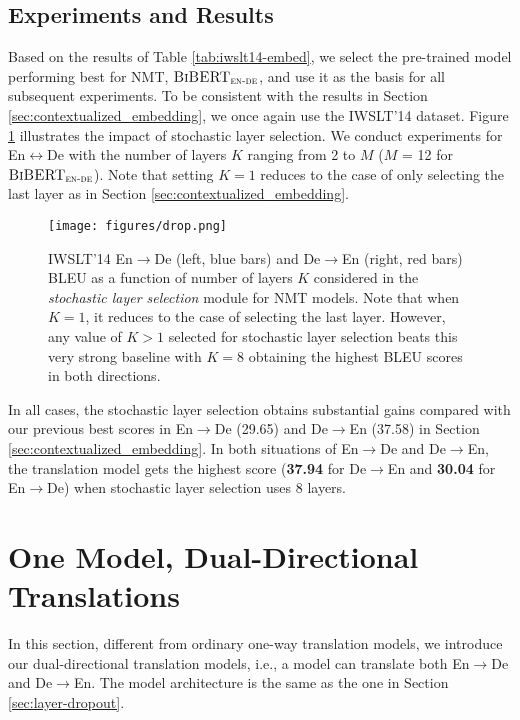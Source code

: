 \documentclass[11pt]{article}
\begin{document}
\subsection{Experiments and Results}
Based on the results of Table \ref{tab:iwslt14-embed}, we select the pre-trained model performing best for NMT, $\textsc{BiBERT}_\textsc{en-de}$, and use it as the basis for
all subsequent experiments. To be consistent with the results in Section \ref{sec:contextualized_embedding}, we once again use the IWSLT'14 dataset. Figure \ref{fig:drop} illustrates the impact of stochastic layer selection. We conduct experiments for En$\leftrightarrow$De with the number of layers $K$ ranging from 2 to $M$ ($M$ = 12 for $\textsc{BiBERT}_\textsc{en-de}$). Note that setting $K=1$ reduces to the case of only selecting  the last layer as in Section \ref{sec:contextualized_embedding}.
\begin{figure}[t]
    \centering
    \texttt{[image: figures/drop.png]}
    \caption{IWSLT'14 En$\rightarrow$De (left, blue bars) and De$\rightarrow$En (right, red bars) BLEU as a function of number of layers $K$ considered in the \textit{stochastic layer selection} module for NMT models. Note that when $K=1$, it reduces to the case of selecting the last layer. However, any value of $K>1$ selected for stochastic layer selection beats this very strong baseline with $K=8$ obtaining the highest BLEU scores in both directions.}
    \label{fig:drop}
\end{figure}

In all cases, the stochastic layer selection obtains substantial gains compared with our previous best scores in En$\rightarrow$De (29.65) and De$\rightarrow$En (37.58) in Section \ref{sec:contextualized_embedding}. In both situations of En$\rightarrow$De and De$\rightarrow$En, the translation model gets the highest score (\textbf{37.94} for De$\rightarrow$En and \textbf{30.04} for En$\rightarrow$De) when stochastic layer selection uses 8 layers. 

\section{One Model, Dual-Directional Translations}
\label{sec:bidirection-model}
In this section, different from ordinary one-way translation models, we introduce our dual-directional translation models, i.e., a model can translate both En$\rightarrow$De and De$\rightarrow$En. The model architecture is the same as the one in Section \ref{sec:layer-dropout}.
\end{document}
